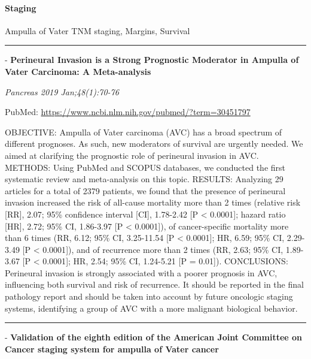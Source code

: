 \documentclass[]{article}
\let\oldparagraph\paragraph
\renewcommand{\paragraph}[1]{\oldparagraph{#1}\mbox{}}
\begin{document}
\pagebreak

\hypertarget{staging-3}{%
\paragraph{Staging}\label{staging-3}}

Ampulla of Vater TNM staging, Margins, Survival

\begin{center}\rule{0.5\linewidth}{\linethickness}\end{center}

 - \textbf{Perineural Invasion is a Strong Prognostic Moderator in
Ampulla of Vater Carcinoma: A Meta-analysis}

\emph{Pancreas 2019 Jan;48(1):70-76}

PubMed: \url{https://www.ncbi.nlm.nih.gov/pubmed/?term=30451797}

OBJECTIVE: Ampulla of Vater carcinoma (AVC) has a broad spectrum of
different prognoses. As such, new moderators of survival are urgently
needed. We aimed at clarifying the prognostic role of perineural
invasion in AVC. METHODS: Using PubMed and SCOPUS databases, we
conducted the first systematic review and meta-analysis on this topic.
RESULTS: Analyzing 29 articles for a total of 2379 patients, we found
that the presence of perineural invasion increased the risk of all-cause
mortality more than 2 times (relative risk {[}RR{]}, 2.07; 95\%
confidence interval {[}CI{]}, 1.78-2.42 {[}P \textless{} 0.0001{]};
hazard ratio {[}HR{]}, 2.72; 95\% CI, 1.86-3.97 {[}P \textless{}
0.0001{]}), of cancer-specific mortality more than 6 times (RR, 6.12;
95\% CI, 3.25-11.54 {[}P \textless{} 0.0001{]}; HR, 6.59; 95\% CI,
2.29-3.49 {[}P \textless{} 0.0001{]}), and of recurrence more than 2
times (RR, 2.63; 95\% CI, 1.89-3.67 {[}P \textless{} 0.0001{]}; HR,
2.54; 95\% CI, 1.24-5.21 {[}P = 0.01{]}). CONCLUSIONS: Perineural
invasion is strongly associated with a poorer prognosis in AVC,
influencing both survival and risk of recurrence. It should be reported
in the final pathology report and should be taken into account by future
oncologic staging systems, identifying a group of AVC with a more
malignant biological behavior.

{}

{}

\begin{center}\rule{0.5\linewidth}{\linethickness}\end{center}

 - \textbf{Validation of the eighth edition of the American Joint
Committee on Cancer staging system for ampulla of Vater cancer}
\end{document}
